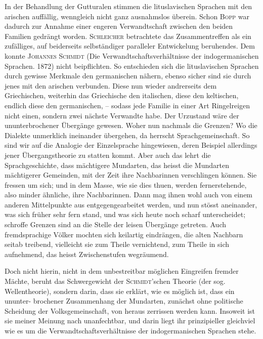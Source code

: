 In der Behandlung der Gutturalen stimmen die lituslavischen Sprachen mit den arischen auffällig, wenngleich nicht ganz ausnahmslos überein. Schon \textsc{Bopp} war dadurch zur Annahme einer engeren Verwandtschaft zwischen den beiden Familien gedrängt worden. \textsc{Schleicher} betrachtete das Zusammentreffen als ein zufälliges, auf beiderseits selbständiger paralleler Entwickelung beruhendes. Dem konnte \textsc{Johannes Schmidt} (Die Verwandtschaftsverhältnisse der indogermanischen Sprachen. 1872) nicht beipflichten. So entschieden sich die lituslavischen Sprachen durch gewisse Merkmale den germanischen nähern, ebenso sicher sind sie durch \label{fp.175} jenes mit den arischen verbunden. Diese nun wieder andrerseits dem Griechischen, weiterhin das Griechische den italischen, diese den keltischen, endlich diese den germanischen, – sodass jede Familie in einer Art Ringelreigen nicht einen, sondern zwei nächste Verwandte habe. Der Urzustand wäre der ununterbrochener Übergänge gewesen. Woher nun nachmals die Grenzen? Wo die Dialekte unmerklich ineinander übergehen, da herrscht Sprachgemeinschaft. So sind wir auf die Analogie der Einzelsprache hingewiesen, deren Beispiel allerdings jener Übergangstheorie zu statten kommt. Aber auch das lehrt die Sprachgeschichte, dass mächtigere Mundarten, das heisst die Mundarten mächtigerer Gemeinden, mit der Zeit ihre Nachbarinnen verschlingen können. Sie fressen um sich; und in dem Masse, wie sie dies thuen, werden fernerstehende, also minder ähnliche, ihre Nachbarinnen. Dann mag ihnen wohl auch von einem anderen Mittelpunkte aus entgegengearbeitet werden, und nun stösst aneinander, was sich früher sehr fern stand, und was sich heute noch scharf unterscheidet; schroffe Grenzen sind an die Stelle der leisen Übergänge getreten. Auch fremdsprachige Völker mochten sich keilartig eindrängen, die alten Nachbarn seitab treibend, vielleicht sie zum Theile vernichtend, zum Theile in sich aufnehmend, das heisst Zwischenstufen wegräumend.

Doch nicht hierin, nicht in dem unbestreitbar möglichen Eingreifen fremder Mächte, beruht das Schwergewicht der \textsc{Schmidt}’schen Theorie (der sog. Wellentheorie), sondern darin, dass sie erklärt, wie es möglich ist, dass ein ununter- \label{sp.165}brochener Zusammenhang der Mundarten, zunächst ohne politische Scheidung der Volksgemeinschaft, von  heraus zerrissen werden kann. Insoweit ist sie meiner Meinung nach unanfechtbar, und darin liegt ihr prinzipieller  gleichviel wie es um die Verwandtschaftsverhältnisse der indogermanischen Sprachen stehe.

